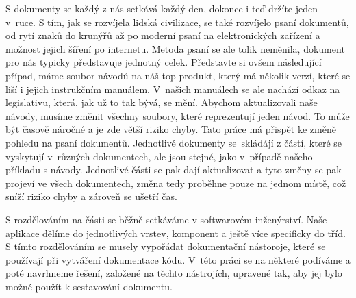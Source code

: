 S dokumenty se každý z nás setkává každý den, dokonce i teď držíte jeden v~ruce. S tím, jak se rozvíjela lidská civilizace,
se také rozvíjelo psaní dokumentů, od rytí znaků do krunýřů až po moderní psaní na elektronických zařízení a možnost jejich šíření po internetu.
Metoda psaní se ale tolik neměnila, dokument pro nás typicky představuje jednotný celek. Představte si ovšem \linebreak následující případ, máme soubor návodů na náš top
produkt, který má několik verzí, které se liší i jejich instrukčním manuálem. V~našich manuálech se ale nachází odkaz na legislativu, která, jak už to tak
bývá, se mění. Abychom aktualizovali naše návody, musíme změnit všechny soubory, které reprezentují jeden návod. To může být časově náročné a je zde větší riziko
chyby. Tato práce má přispět ke změně pohledu na psaní dokumentů. Jednotlivé dokumenty se~skládájí z částí, které se vyskytují v~různých dokumentech, ale jsou stejné,
jako v~případě našeho příkladu s návody. Jednotlivé části se pak dají aktualizovat a tyto změny se pak projeví ve všech dokumentech, změna tedy proběhne
pouze na jednom místě, což sníží riziko chyby a zároveň se ušetří čas.

S rozdělováním na části se běžně setkáváme v softwarovém inženýrství. Naše aplikace dělíme do jednotlivých vrstev, komponent a ještě více specificky do tříd.
S tímto rozdělováním se musely vypořádat dokumentační nástoroje, které se používají při vytváření dokumentace kódu. V~této práci se na některé podíváme a poté navrhneme řešení,
založené na těchto nástrojích, upravené tak, aby jej bylo možné použít k sestavování dokumentu.